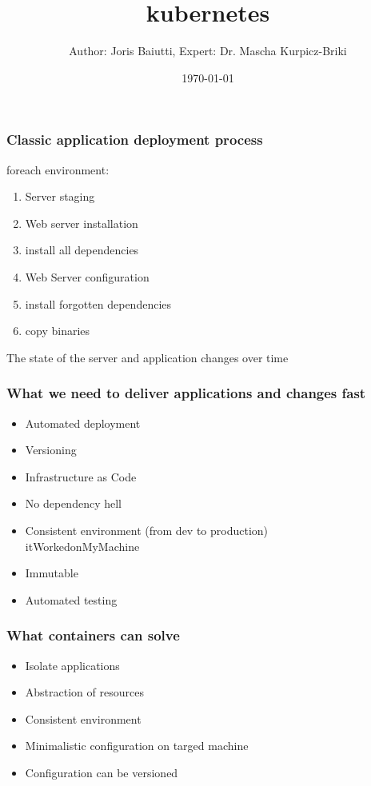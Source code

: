 \documentclass{beamer}
\title{kubernetes}
\author{Author: Joris Baiutti, Expert: Dr. Mascha Kurpicz-Briki}
\institute{Berner Fachhochschule}
\date{\today}
\begin{document}
\begin{frame}
\titlepage
\end{frame}

\begin{frame}
\frametitle{Classic application deployment process}
foreach environment:
\begin{enumerate}
    \item Server staging
    \item Web server installation
    \item install all dependencies
    \item Web Server configuration
    \item install forgotten dependencies
    \item copy binaries
\end{enumerate}
The state of the server and application changes over time
    
\end{frame}

\begin{frame}
\frametitle{What we need to deliver applications and changes fast}
\begin{itemize}
    \item Automated deployment
    \item Versioning
    \item Infrastructure as Code
    \item No dependency hell
    \item Consistent environment (from dev to production)\\ 
    itWorkedonMyMachine
    \item Immutable
    \item Automated testing
\end{itemize}
\end{frame}

\begin{frame}
\frametitle{What containers can solve}
\begin{itemize}
    \item Isolate applications
    \item Abstraction of resources
    \item Consistent environment
    \item Minimalistic configuration on targed machine
    \item Configuration can be versioned
\end{itemize}
\end{frame}
\end{document}
